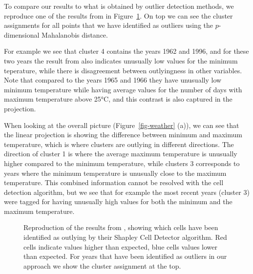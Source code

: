 \documentclass[
  12pt]{article}
\begin{document}
To compare our results to what is obtained by outlier detection methods,
we reproduce one of the results from \citet{filzmoser2018} in
Figure~\ref{fig-shapley}. On top we can see the cluster assignments for
all points that we have identified as outliers using the
\(p\)-dimensional Mahalanobis distance.

For example we see that cluster 4 contains the years 1962 and 1996, and
for these two years the result from \citet{filzmoser2018} also indicates
unusually low values for the minimum teperature, while there is
disagreement between outlyingness in other variables. Note that compared
to the years 1965 and 1966 they have unusually low minimum temperature
while having average values for the number of days with maximum
temperature above 25°C, and this contrast is also captured in the
projection.

When looking at the overall picture (Figure~\ref{fig-weather} (a)), we
can see that the linear projection is showing the difference between
minimum and maximum temperature, which is where clusters are outlying in
different directions. The direction of cluster 1 is where the average
maximum temperature is unusually higher compared to the minimum
temperature, while clusters 3 corresponds to years where the minimum
temperature is unusually close to the maximum temperature. This combined
information cannot be resolved with the cell detection algorithm, but we
see that for example the most recent years (cluster 3) were tagged for
having unusually high values for both the minimum and the maximum
temperature.

\begin{figure}


\caption{\label{fig-shapley}Reproduction of the results from
\citet{filzmoser2018}, showing which cells have been identified as
outlying by their Shapley Cell Detector algorithm. Red cells indicate
values higher than expected, blue cells values lower than expected. For
years that have been identified as outliers in our approach we show the
cluster assignment at the top.}

\end{figure}%
\end{document}
